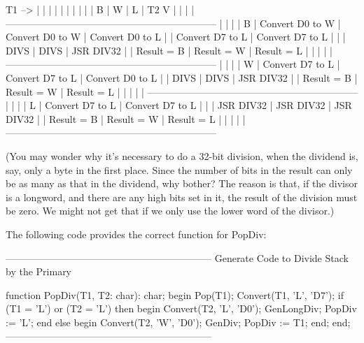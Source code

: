 \documentclass[float=false, crop=false]{standalone}
\begin{document}
  T1 -->  |                 |                 |                 |
          |                 |                 |                 |
      |   |        B        |        W        |       L         |
  T2  V   |                 |                 |                 |
-----------------------------------------------------------------
          |                 |                 |                 |
     B    | Convert D0 to W | Convert D0 to W | Convert D0 to L |
          | Convert D7 to L | Convert D7 to L |                 |
          | DIVS            | DIVS            | JSR DIV32       |
          | Result = B      | Result = W      | Result = L      |
          |                 |                 |                 |
-----------------------------------------------------------------
          |                 |                 |                 |
     W    | Convert D7 to L | Convert D7 to L | Convert D0 to L |
          | DIVS            | DIVS            | JSR DIV32       |
          | Result = B      | Result = W      | Result = L      |
          |                 |                 |                 |
-----------------------------------------------------------------
          |                 |                 |                 |
     L    | Convert D7 to L | Convert D7 to L |                 |
          | JSR DIV32       | JSR DIV32       | JSR DIV32       |
          | Result = B      | Result = W      | Result = L      |
          |                 |                 |                 |
-----------------------------------------------------------------


(You may wonder why it's necessary to do a 32-bit division, when the dividend
is, say, only a byte in the first place. Since the number of bits in the result
can only be as many as that in the dividend, why bother? The reason is that, if
the divisor is a longword, and there are any high bits set in it, the result of
the division must be zero. We might not get that if we only use the lower word
of the divisor.)

The following code provides the correct function for PopDiv:


{---------------------------------------------------------------}
{ Generate Code to Divide Stack by the Primary }

function PopDiv(T1, T2: char): char;
begin
   Pop(T1);
   Convert(T1, 'L', 'D7');
   if (T1 = 'L') or (T2 = 'L') then begin
      Convert(T2, 'L', 'D0');
      GenLongDiv;
      PopDiv := 'L';
      end
   else begin
      Convert(T2, 'W', 'D0');
      GenDiv;
      PopDiv := T1;
   end;
end;
{---------------------------------------------------------------}
\end{document}

